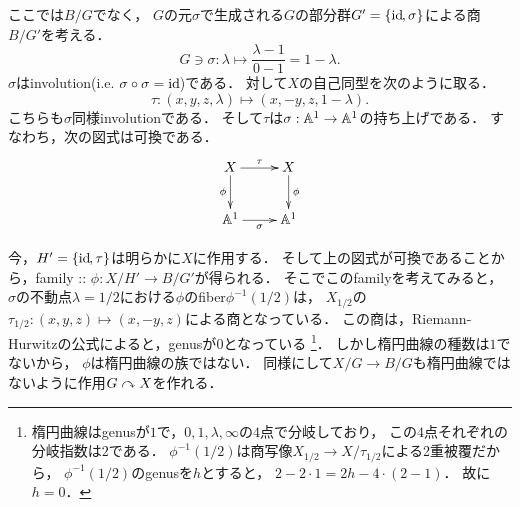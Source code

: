 \documentclass[a4paper]{jsarticle}
\begin{document}
\begin{Example}
        ここでは$B/G$でなく，
        $G$の元$\sigma$で生成される$G$の部分群$G'=\{\mathrm{id}_{\!}, \sigma\}$による商$B/G'$を考える．
        \[ G \ni \sigma: \lambda \mapsto \frac{\lambda-1}{0-1}=1-\lambda. \]
        $\sigma$はinvolution(i.e. $\sigma \circ \sigma=\mathrm{id}_{\!}$)である．
        対して$X$の自己同型を次のように取る．
        \[ \tau: (x,y,z, \lambda) \mapsto (x,-y,z,1-\lambda). \]
        こちらも$\sigma$同様involutionである．
        そして$\tau$は$\sigma: \mathbb{A}^1 \to \mathbb{A}^1$の持ち上げである．
        すなわち，次の図式は可換である．
        \[\xymatrix{
                X \ar[r]^-{\tau}\ar[d]_-{\phi}& X \ar[d]^-{\phi}\\
                \affine^1 \ar[r]_-{\sigma}& \affine^1
        }\]
        
        今，$H'=\{\mathrm{id}_{\!}, \tau\}$は明らかに$X$に作用する．
        そして上の図式が可換であることから，family :: $\phi: X/H' \to B/G'$が得られる．
        そこでこのfamilyを考えてみると，
        $\sigma$の不動点$\lambda=1/2$における$\phi$のfiber$\phi^{-1}(1/2)$は，
        $X_{1/2}$の$\tau_{1/2}:(x,y,z) \mapsto (x,-y,z)$による商となっている．
        この商は，Riemann-Hurwitzの公式によると，genusが$0$となっている
        \footnote
        {
            楕円曲線はgenusが$1$で，$0,1,\lambda, \infty$の$4$点で分岐しており，
            この$4$点それぞれの分岐指数は$2$である．
            $\phi^{-1}(1/2)$は商写像$X_{1/2} \to X/\tau_{1/2}$による2重被覆だから，
            $\phi^{-1}(1/2)$のgenusを$h$とすると，
            $2-2 \cdot 1=2h-4 \cdot (2-1)$．
            故に$h=0$．
        }．
        しかし楕円曲線の種数は$1$でないから，
        $\phi$は楕円曲線の族ではない．
        同様にして$X/G \to B/G$も楕円曲線ではないように作用$G \curvearrowright X$を作れる．
    \end{Example}
\end{document}
